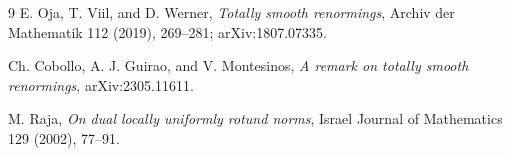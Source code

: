 \documentclass[11pt]{article}
\begin{document}
\begin{thebibliography}{9}
E. Oja, T. Viil, and D. Werner,
\emph{Totally smooth renormings},
Archiv der Mathematik 112 (2019), 269--281; arXiv:1807.07335.

Ch. Cobollo, A. J. Guirao, and V. Montesinos,
\emph{A remark on totally smooth renormings},
arXiv:2305.11611.

M. Raja,
\emph{On dual locally uniformly rotund norms},
Israel Journal of Mathematics 129 (2002), 77--91.
\end{thebibliography}
\end{document}
